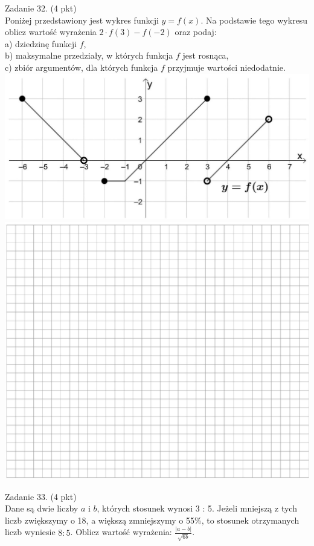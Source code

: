 \documentclass[10pt]{article}
\begin{document}
Zadanie 32. (4 pkt)\\
Poniżej przedstawiony jest wykres funkcji \(y=f(x)\). Na podstawie tego wykresu oblicz wartość wyrażenia \(2 \cdot f(3)-f(-2)\) oraz podaj:\\
a) dziedzinę funkcji \(f\),\\
b) maksymalne przedziały, w których funkcja \(f\) jest rosnąca,\\
c) zbiór argumentów, dla których funkcja \(f\) przyjmuje wartości niedodatnie.\\
\includegraphics[max width=\textwidth, center]{2024_11_21_a68a2ba4fc31c5fb438eg-11}\\
\includegraphics[max width=\textwidth, center]{2024_11_21_a68a2ba4fc31c5fb438eg-11(1)}

Zadanie 33. (4 pkt)\\
Dane są dwie liczby \(a\) i \(b\), których stosunek wynosi 3 : 5. Jeżeli mniejszą z tych liczb zwiększymy o 18, a większą zmniejszymy o 55\%, to stosunek otrzymanych liczb wyniesie \(8: 5\). Oblicz wartość wyrażenia: \(\frac{|a-b|}{\sqrt{6 b}}\).
\end{document}
